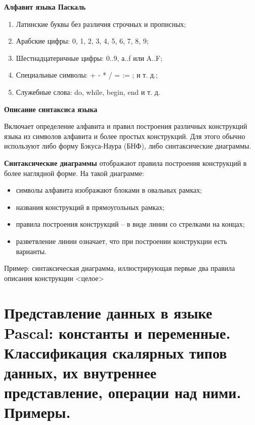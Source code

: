 {\bf{Алфавит языка Паскаль  }}

\begin{enumerate}
\item Латинские буквы без различия строчных и прописных;
\item Арабские цифры: 0, 1, 2, 3, 4, 5, 6, 7, 8, 9;
\item Шестнадцатеричные цифры: 0..9, а..f или A..F;
\item Специальные символы: + - * / = := ; и т. д.;
\item Служебные слова: do, while, begin, end и т. д.
\end{enumerate}

{\bf{Описание синтаксиса языка}}

Включает определение алфавита и правил построения различных конструкций языка из символов алфавита и более простых конструкций. Для этого обычно используют либо форму Бэкуса-Наура (БНФ), либо синтаксические диаграммы.

{\bf{Синтаксические диаграммы}}
отображают правила построения конструкций в более наглядной форме.
На такой диаграмме:
\begin{itemize}
\item символы алфавита изображают блоками в овальных рамках;
\item названия конструкций в прямоугольных рамках;
\item правила построения конструкций – в виде линии со стрелками на концах;
\item разветвление линии означает, что при построении конструкции есть варианты. 
\end{itemize}
Пример: синтаксическая диаграмма, иллюстрирующая первые два правила описания конструкции <целое>



\newpage\section{Представление  данных  в  языке  Pascal:  константы  и  переменные.  Классификация  скалярных типов данных, их внутреннее представление, операции над ними. Примеры.} 

\begin{myquote}

\end{myquote}

